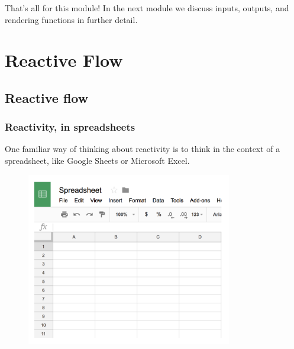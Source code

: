 \documentclass[
  letterpaper,
  DIV=11,
  numbers=noendperiod]{scrreprt}
\begin{document}
\hypertarget{section-26}{%
\subsection{}\label{section-26}}

That's all for this module! In the next module we discuss inputs,
outputs, and rendering functions in further detail.

\hypertarget{reactive-flow}{%
\chapter{Reactive Flow}\label{reactive-flow}}

\hypertarget{reactive-flow-1}{%
\section{Reactive flow}\label{reactive-flow-1}}

\hypertarget{reactivity-in-spreadsheets}{%
\subsection{Reactivity, in
spreadsheets}\label{reactivity-in-spreadsheets}}

One familiar way of thinking about reactivity is to think in the context
of a spreadsheet, like Google Sheets or Microsoft Excel.

\begin{figure}

{\centering \includegraphics[width=0.8\textwidth,height=\textheight]{./images/spreadsheet-1.png}

}

\end{figure}
\end{document}
